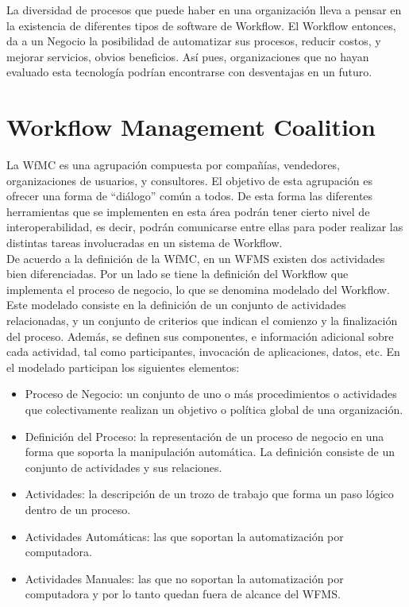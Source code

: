 La diversidad de procesos que puede haber en una organización lleva a pensar en la existencia de diferentes tipos de software de Workflow. El Workflow entonces, da a un Negocio la posibilidad de automatizar sus procesos, reducir costos, y mejorar servicios, obvios beneficios. Así pues, organizaciones que no hayan evaluado esta tecnología podrían encontrarse con desventajas en un futuro.

\section{Workflow Management Coalition}
\label{Workflow Management Coalition}

La WfMC es una agrupación compuesta por compañías, vendedores, organizaciones de usuarios, y consultores. El objetivo de esta agrupación es ofrecer una forma de ``diálogo'' común a todos. De esta forma las diferentes herramientas que se implementen en esta área podrán tener cierto nivel de interoperabilidad, es decir, podrán comunicarse entre ellas para poder realizar las distintas tareas involucradas en un sistema de Workflow.\\

De acuerdo a la definición de la WfMC, en un WFMS existen dos actividades bien diferenciadas. Por un lado se tiene la definición del Workflow que implementa el proceso de negocio, lo que se denomina modelado del Workflow. Este modelado consiste en la definición de un conjunto de actividades relacionadas, y un conjunto de criterios que indican el comienzo y la finalización del proceso. Además, se definen sus componentes, e información adicional sobre cada actividad, tal como participantes, invocación de aplicaciones, datos, etc. En el modelado participan los siguientes elementos:

\begin{itemize}
	\item Proceso de Negocio: un conjunto de uno o más procedimientos o actividades que colectivamente realizan un objetivo o política global de una organización.
	
	\item Definición del Proceso: la representación de un proceso de negocio en una forma que soporta la manipulación automática. La definición consiste de un conjunto de actividades y sus relaciones.
	
	\item Actividades: la descripción de un trozo de trabajo que forma un paso lógico dentro de un proceso.
	
	\item Actividades Automáticas: las que soportan la automatización por computadora. 
	
	\item Actividades Manuales: las que no soportan la automatización por computadora y por lo tanto quedan fuera de alcance del WFMS.
\end{itemize}

